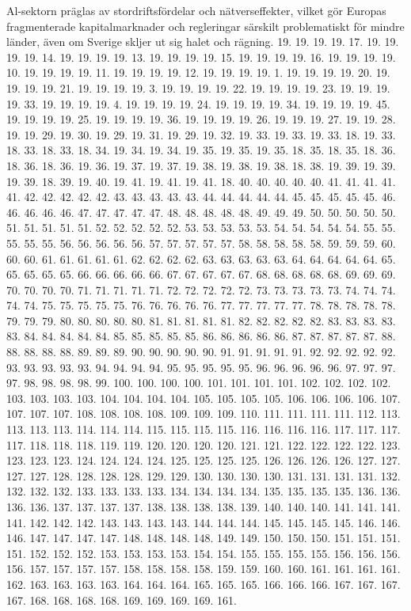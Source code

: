 {Al-sektorn präglas av stordriftsfördelar och nätverseffekter, vilket gör Europas fragmenterade kapitalmarknader och regleringar särskilt problematiskt för mindre länder, även om Sverige skljer ut sig halet och rägning. 19. 19. 19. 19. 17. 19. 19. 19. 19. 14. 19. 19. 19. 19. 13. 19. 19. 19. 19. 15. 19. 19. 19. 19. 16. 19. 19. 19. 19. 10. 19. 19. 19. 19. 11. 19. 19. 19. 19. 12. 19. 19. 19. 19. 1. 19. 19. 19. 19. 20. 19. 19. 19. 19. 21. 19. 19. 19. 19. 3. 19. 19. 19. 19. 22. 19. 19. 19. 19. 23. 19. 19. 19. 19. 33. 19. 19. 19. 19. 4. 19. 19. 19. 19. 24. 19. 19. 19. 19. 34. 19. 19. 19. 19. 45. 19. 19. 19. 19. 25. 19. 19. 19. 19. 36. 19. 19. 19. 19. 26. 19. 19. 19. 27. 19. 19. 28. 19. 19. 29. 19. 30. 19. 29. 19. 31. 19. 29. 19. 32. 19. 33. 19. 33. 19. 33. 18. 19. 33. 18. 33. 18. 33. 18. 34. 19. 34. 19. 34. 19. 35. 19. 35. 19. 35. 18. 35. 18. 35. 18. 36. 18. 36. 18. 36. 19. 36. 19. 37. 19. 37. 19. 38. 19. 38. 19. 38. 18. 38. 19. 39. 19. 39. 19. 39. 18. 39. 19. 40. 19. 41. 19. 41. 19. 41. 18. 40. 40. 40. 40. 40. 41. 41. 41. 41. 41. 42. 42. 42. 42. 42. 43. 43. 43. 43. 43. 44. 44. 44. 44. 44. 45. 45. 45. 45. 45. 46. 46. 46. 46. 46. 47. 47. 47. 47. 47. 48. 48. 48. 48. 48. 49. 49. 49. 50. 50. 50. 50. 50. 51. 51. 51. 51. 51. 52. 52. 52. 52. 52. 53. 53. 53. 53. 53. 54. 54. 54. 54. 54. 55. 55. 55. 55. 55. 56. 56. 56. 56. 56. 57. 57. 57. 57. 57. 58. 58. 58. 58. 58. 59. 59. 59. 60. 60. 60. 61. 61. 61. 61. 61. 62. 62. 62. 62. 63. 63. 63. 63. 63. 64. 64. 64. 64. 64. 65. 65. 65. 65. 65. 66. 66. 66. 66. 66. 67. 67. 67. 67. 67. 68. 68. 68. 68. 68. 69. 69. 69. 70. 70. 70. 70. 71. 71. 71. 71. 71. 72. 72. 72. 72. 72. 73. 73. 73. 73. 73. 74. 74. 74. 74. 74. 75. 75. 75. 75. 75. 76. 76. 76. 76. 76. 77. 77. 77. 77. 77. 78. 78. 78. 78. 78. 79. 79. 79. 80. 80. 80. 80. 80. 81. 81. 81. 81. 81. 82. 82. 82. 82. 82. 83. 83. 83. 83. 83. 84. 84. 84. 84. 84. 85. 85. 85. 85. 85. 86. 86. 86. 86. 86. 87. 87. 87. 87. 87. 88. 88. 88. 88. 88. 89. 89. 89. 90. 90. 90. 90. 90. 91. 91. 91. 91. 91. 92. 92. 92. 92. 92. 93. 93. 93. 93. 93. 94. 94. 94. 94. 95. 95. 95. 95. 95. 96. 96. 96. 96. 96. 97. 97. 97. 97. 98. 98. 98. 98. 99. 100. 100. 100. 100. 101. 101. 101. 101. 102. 102. 102. 102. 103. 103. 103. 103. 104. 104. 104. 104. 105. 105. 105. 105. 106. 106. 106. 106. 107. 107. 107. 107. 108. 108. 108. 108. 109. 109. 109. 110. 111. 111. 111. 111. 112. 113. 113. 113. 113. 114. 114. 114. 115. 115. 115. 115. 116. 116. 116. 116. 117. 117. 117. 117. 118. 118. 118. 119. 119. 120. 120. 120. 120. 121. 121. 122. 122. 122. 122. 123. 123. 123. 123. 124. 124. 124. 124. 125. 125. 125. 125. 126. 126. 126. 126. 127. 127. 127. 127. 128. 128. 128. 128. 129. 129. 130. 130. 130. 130. 131. 131. 131. 131. 132. 132. 132. 132. 133. 133. 133. 133. 134. 134. 134. 134. 135. 135. 135. 135. 136. 136. 136. 136. 137. 137. 137. 137. 138. 138. 138. 138. 139. 140. 140. 140. 141. 141. 141. 141. 142. 142. 142. 143. 143. 143. 143. 144. 144. 144. 145. 145. 145. 145. 146. 146. 146. 147. 147. 147. 147. 148. 148. 148. 148. 149. 149. 150. 150. 150. 151. 151. 151. 151. 152. 152. 152. 153. 153. 153. 153. 154. 154. 155. 155. 155. 155. 156. 156. 156. 156. 157. 157. 157. 157. 158. 158. 158. 158. 159. 159. 160. 160. 161. 161. 161. 161. 162. 163. 163. 163. 163. 164. 164. 164. 165. 165. 165. 166. 166. 166. 167. 167. 167. 167. 168. 168. 168. 168. 169. 169. 169. 169. 161. }
